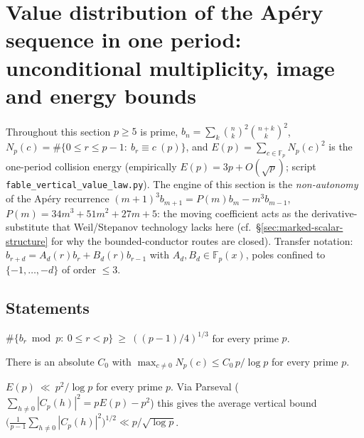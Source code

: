 
\section{Value distribution of the Ap\'ery sequence in one period:
unconditional multiplicity, image and energy bounds}
\label{sec:value-distribution}

Throughout this section $p\ge5$ is prime, $b_n=\sum_k\binom nk^2\binom{n+k}k^2$,
$N_p(c)=\#\{0\le r\le p-1:\ b_r\equiv c\ (p)\}$, and
$E(p)=\sum_{c\in\mathbb F_p}N_p(c)^2$ is the one-period collision energy
(empirically $E(p)=3p+O(\sqrt p)$; script \texttt{fable\_vertical\_value\_law.py}).
The engine of this section is the \emph{non-autonomy} of the Ap\'ery recurrence
$(m+1)^3b_{m+1}=P(m)b_m-m^3b_{m-1}$, $P(m)=34m^3+51m^2+27m+5$: the moving
coefficient acts as the derivative-substitute that Weil/Stepanov technology
lacks here (cf.\ \S\ref{sec:marked-scalar-structure} for why the bounded-conductor
routes are closed).  Transfer notation: $b_{r+d}=A_d(r)b_r+B_d(r)b_{r-1}$ with
$A_d,B_d\in\mathbb F_p(x)$, poles confined to $\{-1,\dots,-d\}$ of order $\le3$.

\subsection{Statements}

\begin{theorem}[image]\label{thm:image}
$\#\{b_r\bmod p:\ 0\le r<p\}\ \ge\ ((p-1)/4)^{1/3}$ for every prime $p$.
\end{theorem}

\begin{theorem}[multiplicity]\label{thm:mult}
There is an absolute $C_0$ with $\max_{c\ne0}N_p(c)\le C_0\,p/\log p$ for every prime $p$.
\end{theorem}

\begin{theorem}[energy]\label{thm:energy}
$E(p)\ \ll\ p^2/\log p$ for every prime $p$.  Via Parseval
($\sum_{h\ne0}|C_p(h)|^2=pE(p)-p^2$) this gives the average vertical bound
$\bigl(\tfrac1{p-1}\sum_{h\ne0}|C_p(h)|^2\bigr)^{1/2}\ll p/\sqrt{\log p}$.
\end{theorem}

